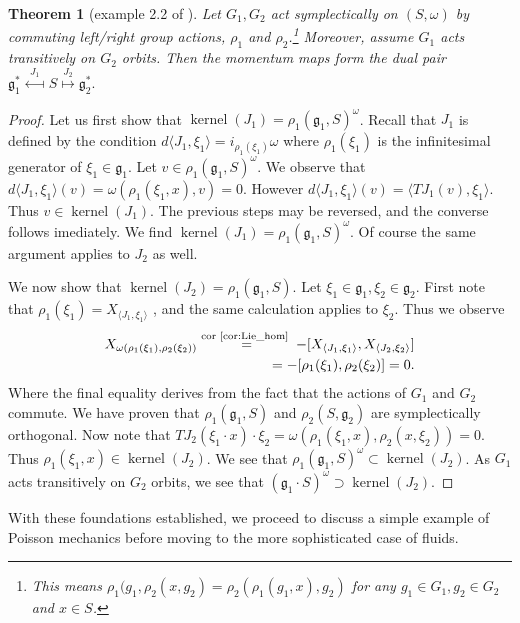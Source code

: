 \documentclass[12pt]{amsart}
\newtheorem{thm}{Theorem}[section]
\DeclareMathOperator{\kernel}{kernel}
\begin{document}
  \begin{thm}[example 2.2 of \cite{Gay-BalmazVizman2011}] \label{thm:commuting_actions}
    Let $G_1,G_2$ act symplectically on $(S,\omega)$
    by commuting left/right group actions, $\rho_1$ and $\rho_2$.\footnote{
      This means 
      $\rho_1(g_1 , \rho_2 (x , g_2) = \rho_2(\rho_1(g_1 , x) ,g_2)$
      for any $g_1 \in G_1, g_2 \in G_2$ and $x \in S$.}
    Moreover, assume $G_1$ acts transitively on $G_2$ orbits.
    Then the momentum maps form the dual pair
    $
      \mathfrak{g}^*_1
      \stackrel{J_1}{\longmapsfrom}
      S
      \stackrel{J_2}{\longmapsto}
      \mathfrak{g}_2^*.
    $
  \end{thm}
  \begin{proof}
    Let us first show that $\kernel(J_1) = \rho_1(\mathfrak{g}_1 , S )^\omega$.
    Recall that $J_1$ is defined by the condition
    $d \langle J_1 , \xi_1 \rangle = i_{\rho_1(\xi_1)} \omega$
    where $\rho_1(\xi_1)$ is the infinitesimal generator of
    $\xi_1 \in \mathfrak{g}_1$.
    Let $v \in \rho_1(\mathfrak{g}_1,S)^\omega$.
    We observe that 
    $d \langle J_1 , \xi_1 \rangle (v) = \omega( \rho_1(\xi_1, x ), v ) = 0$.
    However $d\langle J_1 , \xi_1 \rangle (v) = \langle TJ_1(v) , \xi_1 \rangle$.
    Thus $v \in \kernel(J_1)$.
    The previous steps may be reversed, and
    the converse follows imediately.
    We find
    $\kernel(J_1) = \rho_1(\mathfrak{g}_1,S)^\omega$.
    Of course the same argument applies to $J_2$ as well.

    We now show that $\kernel(J_2) = \rho_1(\mathfrak{g}_1,S)$.
    Let $\xi_1 \in \mathfrak{g}_1, \xi_2 \in \mathfrak{g}_2$.
    First note that $\rho_1(\xi_1) = X_{ \langle J_1 , \xi_1 \rangle}$
    , and the same calculation applies to $\xi_2$.
    Thus we observe
    \begin{align*}
      X_{ \omega( \rho_1(\xi_1) , \rho_2(\xi_2) ) } 
      \stackrel{ \text{cor \ref{cor:Lie_hom} } }{=}
        - [X_{ \langle J_1,\xi_1\rangle} , X_{\langle J_2,\xi_2\rangle} ] \\
     = - [\rho_1(\xi_1) , \rho_2(\xi_2)] = 0.
    \end{align*}
    Where the final equality
    derives from the fact that the actions of $G_1$ and $G_2$ commute.
    We have proven that $\rho_1(\mathfrak{g}_1 , S)$ and $\rho_2(S,\mathfrak{g}_2)$ are
    symplectically orthogonal.
    Now note that
    $TJ_2 ( \xi_1 \cdot x) \cdot \xi_2 = \omega( \rho_1(\xi_1, x) ,\rho_2(x, \xi_2 )) = 0$.
    Thus $\rho_1(\xi_1 , x) \in \kernel( J_2)$.
    We see that $\rho_1(\mathfrak{g}_1 ,S)^\omega \subset \kernel(J_2)$.
    As $G_1$ acts transitively on $G_2$ orbits, we see
    that $(\mathfrak{g}_1 \cdot S)^\omega \supset \kernel( J_2)$.
  \end{proof}
  With these foundations established, we proceed
  to discuss a simple example of Poisson mechanics
  before moving to the more sophisticated case
  of fluids.
\end{document}
